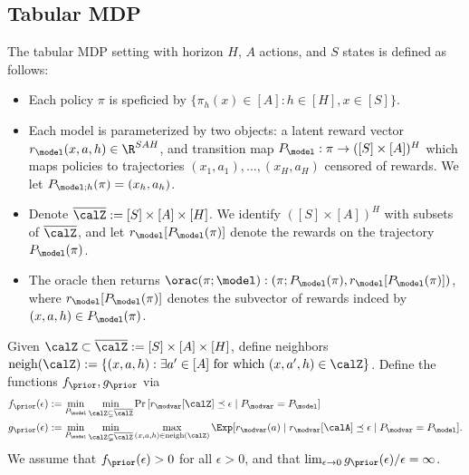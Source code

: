 \subsection{Tabular MDP}
\begin{setting} The  tabular MDP setting with horizon $H$, $A$ actions, and $S$ states is defined as follows:
\begin{itemize}
	\item Each policy $\pi$ is speficied by $\{\pi_h(x) \in [A]: h \in [H], x \in [S]\}$.
	\item Each model is parameterized by two objects: a latent reward vector $r_{\model}(x,a,h) \in \R^{SAH}$, and transition map $P_{\model}: \pi \to  ([S] \times [A])^H$ which maps policies to  trajectories $(x_1,a_1),\dots,(x_H,a_H)$ censored of rewards. We let $P_{\model;h}(\pi) = (x_{h},a_h)$. 
	\item Denote $\calZbar := [S] \times [A] \times [H]$. We identify $([S] \times [A])^H$ with subsets of $\calZbar$, and let $r_{\model}[P_{\model}(\pi)]$ denote the rewards on the trajectory $P_{\model}(\pi)$.
	 \item The oracle then returns $\orac(\pi;\model) : (\pi;P_{\model}(\pi), r_{\model}[P_{\model}(\pi)])$, where $r_{\model}[P_{\model}(\pi)]$ denotes the subvector of rewards indced by $(x,a,h) \in P_{\model}(\pi)$.
\end{itemize} 
\end{setting}


\newcommand{\neighbors}{\mathrm{neigh}}

\begin{condition}\label{cond:bandits_two} Given $\calZ \subset \calZbar := [S] \times [A] \times [H]$, define neighbors $\neighbors(\calZ) := \{(x,a,h): \exists a' \in [A] \text{ for which } (x,a',h) \in \calZ\}$. Define the functions $f_{\prior},g_{\prior}$ via
\begin{align*}
f_{\prior}(\epsilon) &:= \min_{P_{\model}}\min_{\calZ \subsetneq \calZbar}\Pr\left[r_{\modvar}[\calZ] \preceq \epsilon \mid P_{\modvar} = P_{\model} \right]\\
g_{\prior}(\epsilon) &:=  \min_{P_{\model}}\min_{\calZ \subsetneq \calZbar} \max_{(x,a,h) \in \neighbors(\calZ)} \Exp[r_{\modvar}(a) \mid r_{\modvar}[\calA] \preceq \epsilon \mid P_{\modvar} = P_{\model}].
\end{align*}
We assume that $\fprior(\epsilon) > 0$ for all $\epsilon > 0$, and that $\lim_{\epsilon \to 0} \gprior(\epsilon)/\epsilon = \infty$.
\end{condition}

